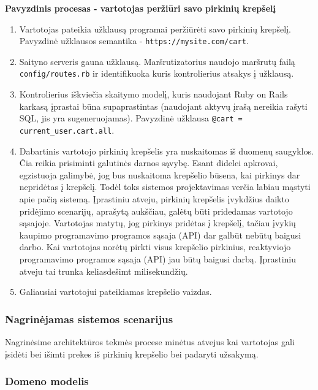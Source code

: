 \textbf{Pavyzdinis procesas - vartotojas peržiūri savo pirkinių krepšelį}

\begin{enumerate}
  \item Vartotojas pateikia užklausą programai peržiūrėti savo pirkinių krepšelį. Pavyzdinė užklausos semantika - \lstinline|https://mysite.com/cart|.

  \item Saityno serveris gauna užklausą. Maršrutizatorius naudojo maršrutų failą \lstinline|config/routes.rb| ir identifikuoka kuris kontrolierius atsakys į užklausą.

  \item Kontrolierius iškviečia skaitymo modelį, kuris naudojant Ruby on Rails karkasą įprastai būna supaprastintas (naudojant aktyvų įrašą nereikia rašyti SQL, jis yra sugeneruojamas). Pavyzdinė užklausa \lstinline|@cart = current_user.cart.all|.

  \item Dabartinis vartotojo pirkinių krepšelis yra nuskaitomas iš duomenų saugyklos. Čia reikia prisiminti galutinės darnos sąvybę. Esant didelei apkrovai, egzistuoja galimybė, jog bus nuskaitoma krepšelio būsena, kai pirkinys dar nepridėtas į krepšelį. Todėl toks sistemos projektavimas verčia labiau mąstyti apie pačią sistemą. Įprastiniu atveju, pirkinių krepšelis įvykdžius daikto pridėjimo scenarijų, aprašytą aukščiau, galėtų būti pridedamas vartotojo sąsajoje. Vartotojas matytų, jog pirkinys pridėtas į krepšelį, tačiau įvykių kaupimo programavimo programos sąsaja (API) dar galbūt nebūtų baigusi darbo. Kai vartotojas norėtų pirkti visus krepšelio pirkinius, reaktyviojo programavimo programos sąsaja (API) jau būtų baigusi darbą. Įprastiniu atveju tai trunka keliasdešimt milisekundžių.

  \item Galiausiai vartotojui pateikiamas krepšelio vaizdas.
\end{enumerate}

\subsubsection{Nagrinėjamas sistemos scenarijus}

Nagrinėsime architektūros tekmės procese minėtus atvejus kai vartotojas gali įsidėti bei išimti prekes iš pirkinių krepšelio bei padaryti užsakymą.

\subsubsection{Domeno modelis}

